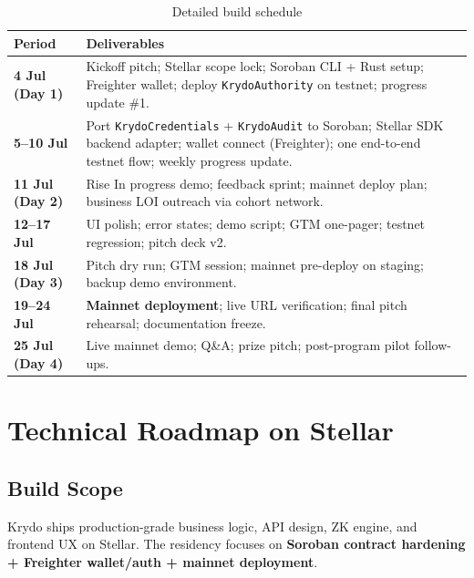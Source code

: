 \documentclass[11pt,a4paper]{article}
\newcommand{\krydo}{\textsf{Krydo}}
\newcommand{\stellar}{\textsf{Stellar}}
\begin{document}
\begin{table}[H]
  \centering
  \caption{Detailed build schedule}
  \renewcommand{\arraystretch}{1.15}
  \small
  \begin{tabularx}{\textwidth}{@{}>{\bfseries}p{2.2cm} X@{}}
    \toprule
    Period & Deliverables \\
    \midrule
    4 Jul (Day 1) &
    Kickoff pitch; Stellar scope lock; Soroban CLI + Rust setup; Freighter wallet;
    deploy \texttt{KrydoAuthority} on testnet; progress update \#1. \\

    5--10 Jul &
    Port \texttt{KrydoCredentials} + \texttt{KrydoAudit} to Soroban;
    Stellar SDK backend adapter; wallet connect (Freighter);
    one end-to-end testnet flow; weekly progress update. \\

    11 Jul (Day 2) &
    Rise In progress demo; feedback sprint; mainnet deploy plan;
    business LOI outreach via cohort network. \\

    12--17 Jul &
    UI polish; error states; demo script; GTM one-pager;
    testnet regression; pitch deck v2. \\

    18 Jul (Day 3) &
    Pitch dry run; GTM session; mainnet pre-deploy on staging;
    backup demo environment. \\

    19--24 Jul &
    \textbf{Mainnet deployment}; live URL verification;
    final pitch rehearsal; documentation freeze. \\

    25 Jul (Day 4) &
    Live mainnet demo; Q\&A; prize pitch; post-program pilot follow-ups. \\
    \bottomrule
  \end{tabularx}
\end{table}

\section{Technical Roadmap on \stellar{}}

\subsection{Build Scope}

\krydo{} ships production-grade business logic, API design, ZK engine, and frontend UX on \stellar{}. The residency focuses on \textbf{Soroban contract hardening + Freighter wallet/auth + mainnet deployment}.
\end{document}
